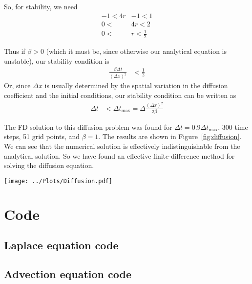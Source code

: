 \documentclass[twocolumn]{myarticle}
\begin{document}
So, for stability, we need
\begin{align}
    -1 < 4r &- 1 < 1
    \\
    0 < &4r < 2
    \\
    0 < &r < \frac{1}{2}
\end{align}

Thus if $ \beta > 0 $ (which it must be, since otherwise our analytical equation is unstable), our stability condition is
\begin{align}
    \frac{\beta \Delta t}{(\Delta x)^2} &< \frac{1}{2}
\end{align}
Or, since $ \Delta x $ is usually determined by the spatial variation in the diffusion coefficient and the initial conditions, our stability condition can be written as
\begin{align}
    \Delta t &< \Delta t_\text{max} = \Delta\frac{(\Delta x)^2}{2 \beta}
\end{align}

The FD solution to this diffusion problem was found for $ \Delta t = 0.9 \Delta t_\text{max} $, 300 time steps, 51 grid points, and $ \beta = 1 $.
The results are shown in Figure~\ref{fig:diffusion}.
We can see that the numerical solution is effectively indistinguishable from the analytical solution.
So we have found an effective finite-difference method for solving the diffusion equation.

\begin{figure*}[ht]
    \centering
    \texttt{[image: ../Plots/Diffusion.pdf]}
    \caption{Numerical and analytical solutions to the diffusion equation.}
    \label{fig:diffusion}
\end{figure*}



\onecolumn



\section{Code}
\label{sec:code}

\subsection{Laplace equation code}
\label{subsec:laplace_equation_code}


\vspace{10pt}

\subsection{Advection equation code}
\label{subsec:advection_equation_code}


\vspace{10pt}
\end{document}
